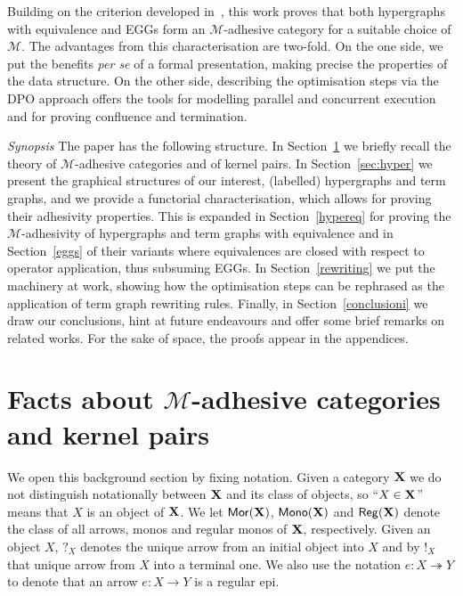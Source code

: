 \documentclass[3p]{elsarticle}
\def\X{\textbf {\textup{X}}}
\newcommand{\mor}{\mathsf{Mor}}
\newcommand{\mon}{\mathsf{Mono}}
\newcommand{\reg}{\mathsf{Reg}}
\newcommand{\eto}{\twoheadrightarrow}
\theoremstyle{remark}
\theoremstyle{definition}
\begin{document}

Building on the criterion developed in~\cite{CastelnovoGM24}, this work proves that both hypergraphs with equivalence
and EGGs form an 
$\mathcal{M}$-adhesive category for a suitable choice of $\mathcal{M}$.
The advantages from this characterisation are two-fold. On the one side, 
we put the benefits \emph{per se} of a formal presentation, making precise the properties of the data structure. 
On the other side, describing the optimisation steps via the DPO approach
offers the tools for modelling  parallel and concurrent execution
and for proving  confluence and termination.

\emph{Synopsis}
The paper has the following structure. 
In Section~\ref{sec:ade} we briefly recall 
the theory of $\mathcal{M}$-adhesive categories
and of kernel pairs.
In Section~\ref{sec:hyper} we present the graphical structures of our interest, 
 (labelled) hypergraphs and term graphs, and we provide a
functorial characterisation, which allows for proving their adhesivity properties.
This is expanded in Section~\ref{hypereq} for proving the $\mathcal{M}$-adhesivity
of hypergraphs 
and term graphs with equivalence and in Section~\ref{eggs} of
their variants where equivalences are closed with respect to operator application,
thus subsuming EGGs.
%
In Section~\ref{rewriting} we put the machinery at work, showing how the optimisation steps
can be rephrased as the application of term graph rewriting rules.
%
Finally, in Section~\ref{conclusioni} we draw our conclusions, hint at future endeavours and offer some 
brief remarks on related works.
%
For the sake of space, the proofs appear in the appendices. 


\section{Facts about $\mathcal{M}$-adhesive categories and kernel pairs}\label{sec:ade}

We open this background section by fixing notation. Given a category $\X$ we do not distinguish notationally between $\X$ and its class of objects, so
``$X\in \X$'' means that $X$ is an object of $\X$. We let $\mor(\X)$, $\mon(\X)$ and $\reg(\X)$ denote the class of all arrows, monos and regular monos of $\X$, respectively.  Given an object $X$, $?_X$ denotes the unique arrow from an initial object into $X$ and by $!_X$ that  unique arrow from $X$ into a terminal one. We also use the notation $e\colon X\eto Y$ to denote that an arrow $e\colon X\to Y$ is a regular epi. 
\end{document}
